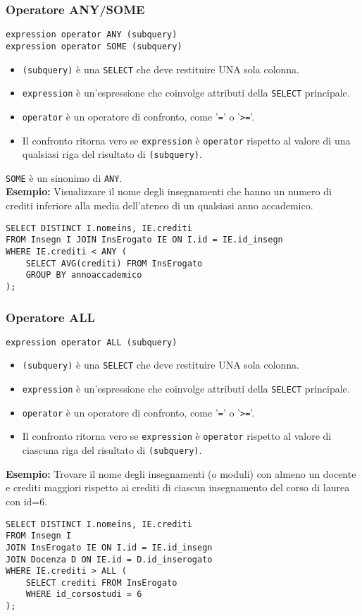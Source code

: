 \documentclass[a4paper, 10pt, titlepage]{article}
\begin{document}
	\subsubsection*{Operatore ANY/SOME}
		\begin{lstlisting}
expression operator ANY (subquery)
expression operator SOME (subquery)
		\end{lstlisting}
		\begin{itemize}
		\item \lstinline|(subquery)| è una \lstinline|SELECT| che deve restituire UNA sola colonna.
		\item \lstinline|expression| è un’espressione che coinvolge attributi della \lstinline|SELECT|
		principale.
		\item \lstinline|operator| è un operatore di confronto, come '\lstinline|=|' o '\lstinline|>=|'.
		\item Il confronto ritorna vero se \lstinline|expression| è \lstinline|operator| rispetto al valore di una qualsiasi riga del risultato di \lstinline|(subquery)|.
		\end{itemize}
		\lstinline|SOME| è un sinonimo di \lstinline|ANY|. \medskip \\
				\textbf{Esempio:} Visualizzare il nome degli insegnamenti che hanno un numero di crediti
		inferiore alla media dell’ateneo di un qualsiasi anno accademico.
		\begin{lstlisting}
SELECT DISTINCT I.nomeins, IE.crediti
FROM Insegn I JOIN InsErogato IE ON I.id = IE.id_insegn
WHERE IE.crediti < ANY (
    SELECT AVG(crediti) FROM InsErogato
    GROUP BY annoaccademico
);
		\end{lstlisting}
		\medskip 
	\subsubsection*{Operatore ALL}
		\begin{lstlisting}
expression operator ALL (subquery)
		\end{lstlisting}
		\begin{itemize}
		\item \lstinline|(subquery)| è una \lstinline|SELECT| che deve restituire UNA sola colonna.
		\item \lstinline|expression| è un’espressione che coinvolge attributi della \lstinline|SELECT|
		principale.
		\item \lstinline|operator| è un operatore di confronto, come ’\lstinline|=|’ o ’\lstinline|>=|’.
		\item Il confronto ritorna vero se \lstinline|expression| è \lstinline|operator| rispetto al valore di ciascuna riga del risultato di \lstinline|(subquery)|.
		\end{itemize}
\medskip 		
		\textbf{Esempio:} Trovare il nome degli insegnamenti (o moduli) con almeno un docente e
		crediti maggiori rispetto ai crediti di ciascun insegnamento del corso di laurea
		con id=6.
		\begin{lstlisting}
SELECT DISTINCT I.nomeins, IE.crediti
FROM Insegn I
JOIN InsErogato IE ON I.id = IE.id_insegn
JOIN Docenza D ON IE.id = D.id_inserogato
WHERE IE.crediti > ALL (
    SELECT crediti FROM InsErogato
    WHERE id_corsostudi = 6
);
		\end{lstlisting}
		\newpage
\end{document}
